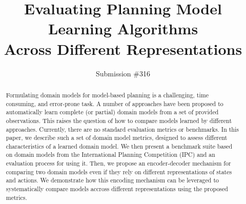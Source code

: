 \documentclass{article}
\title{Evaluating Planning Model Learning Algorithms \\ Across Different Representations}
\author{Submission \#316}
\theoremstyle{definition}
\theoremstyle{remark}
\newif\ifaddcomments
\newcommand{\leo}[1]{\ifaddcomments{\textcolor{pink}{[Leonardo: #1]}}\fi}
\begin{document}
\maketitle

\begin{abstract}
Formulating domain models for model-based planning  is a challenging, time consuming, and error-prone task. A number of approaches have been proposed to automatically learn complete (or partial) domain models from a set of provided observations. This raises the question of how to compare models learned by different approaches. Currently, there are no standard evaluation metrics or benchmarks. 
In this paper, we describe such a set of domain model metrics, designed to assess different characteristics of a learned domain model. We then present a benchmark suite based on domain models from the International Planning Competition (IPC) and an evaluation process for using it.
Then, we propose an encoder-decoder mechanism for comparing two domain models even if they rely on different representations of states and actions. 
We demonstrate how this encoding mechanism can be leveraged to systematically compare models accross different representations using the proposed metrics. 

\end{abstract}
\end{document}
